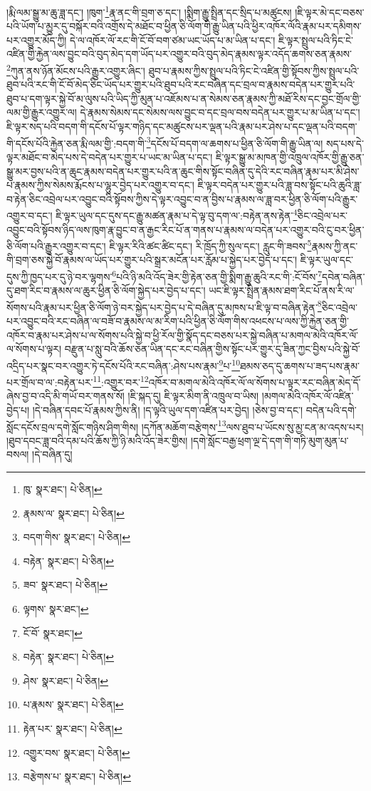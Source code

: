 །རྨི་ལམ་སྒྱུ་མ་ཆུ་ཟླ་དང་། །ཁུག་\footnote{ཁུ་  སྣར་ཐང་།  པེ་ཅིན། }རྣ་ནང་གི་བྲག་ཅ་དང་། །སྨིག་རྒྱུ་སྤྲིན་དང་སྲིད་པ་མཚུངས། །ཇི་ལྟར་མེ་དང་བཅས་པའི་ཡོག་པ་མྱུར་དུ་བསྐོར་བའི་འགྲོས་དེ་མཐོང་བ་ཕྱིན་ཅི་ལོག་གི་རྒྱུ་ཡིན་པའི་ཕྱིར་འཁོར་ལོའི་རྣམ་པར་དམིགས་པར་འགྱུར་མོད་ཀྱི། དེ་ལ་འཁོར་ལོ་རང་གི་ངོ་བོ་བག་ཙམ་ཡང་ཡོད་པ་མ་ཡིན་པ་དང་། ཇི་ལྟར་སྤྲུལ་པའི་ཏིང་ངེ་འཛིན་གྱི་རྐྱེན་ལས་བྱུང་བའི་བུད་མེད་དག་ཡོད་པར་འགྱུར་བའི་བུད་མེད་རྣམས་ལྟར་འདོད་ཆགས་ཅན་རྣམས་\footnote{རྣམས་ལ་  སྣར་ཐང་།  པེ་ཅིན། }ཀུན་ནས་ཉོན་མོངས་པའི་རྒྱུར་འགྱུར་ཞིང་། ཐུབ་པ་རྣམས་ཀྱིས་སྤྲུལ་པའི་ཏིང་ངེ་འཛིན་གྱི་སྟོབས་ཀྱིས་སྤྲུལ་པའི་ཐུབ་པའི་རང་གི་ངོ་བོ་མེད་ཅིང་ཡོད་པར་གྱུར་པའི་ཐུབ་པའི་རང་བཞིན་དང་བྲལ་བ་རྣམས་བདེན་པར་གྱུར་པའི་ཐུབ་པ་དག་ལྟར་སྐྱེ་བོ་མ་ལུས་པའི་ཡིད་ཀྱི་མུན་པ་འཇོམས་པ་ན་སེམས་ཅན་རྣམས་ཀྱི་མཐོ་རིས་དང་བྱང་གྲོལ་གྱི་ལམ་གྱི་རྒྱུར་འགྱུར་ལ། དེ་རྣམས་སེམས་དང་སེམས་ལས་བྱུང་བ་དང་བྲལ་བས་བདེན་པར་གྱུར་པ་མ་ཡིན་པ་དང་། ཇི་ལྟར་སད་པའི་བདག་གི་དངོས་པོ་ལྟར་གཉིད་དང་མཚུངས་པར་ལྡན་པའི་རྣམ་པར་ཤེས་པ་དང་ལྡན་པའི་བདག་གི་དངོས་པོའི་རྐྱེན་ཅན་རྨི་ལམ་གྱི་:བདག་གི་\footnote{བདག་གིས་  སྣར་ཐང་།  པེ་ཅིན། }དངོས་པོ་བདག་ལ་ཆགས་པ་ཕྱིན་ཅི་ལོག་གི་རྒྱུ་ཡིན་ལ། སད་པས་དེ་ལྟར་མཐོང་བ་མེད་པས་དེ་བདེན་པར་གྱུར་པ་ཡང་མ་ཡིན་པ་དང་། ཇི་ལྟར་སྒྱུ་མ་མཁན་གྱི་འཁྲུལ་འཁོར་གྱི་རྒྱུ་ཅན་སྒྱུ་མར་བྱས་པའི་ན་ཆུང་རྣམས་བདེན་པར་གྱུར་པའི་ན་ཆུང་གིས་སྟོང་བཞིན་དུ་དེའི་རང་བཞིན་རྣམ་པར་མི་ཤེས་པ་རྣམས་ཀྱིས་སེམས་རྨོངས་པ་ལྷུར་བྱེད་པར་འགྱུར་བ་དང་། ཇི་ལྟར་བདེན་པར་གྱུར་པའི་ཟླ་བས་སྟོང་པའི་ཆུའི་ཟླ་བ་རྟེན་ཅིང་འབྲེལ་པར་འབྱུང་བའི་སྟོབས་ཀྱིས་དེ་ལྟར་འབྱུང་བ་ན་བྱིས་པ་རྣམས་ལ་ཟླ་བར་ཕྱིན་ཅི་ལོག་པའི་རྒྱུར་འགྱུར་བ་དང་། ཇི་ལྟར་ཡུལ་དང་དུས་དང་རྒྱུ་མཚན་རྣམ་པ་དེ་ལྟ་བུ་དག་ལ་:བརྟེན་ནས་རྟེན་\footnote{བརྟེན་  སྣར་ཐང་།  པེ་ཅིན། }ཅིང་འབྲེལ་པར་འབྱུང་བའི་སྟོབས་ཉིད་ལས་ཁུག་རྣ་བྱུང་བ་ན་རྒྱང་རིང་པོ་ན་གནས་པ་རྣམས་ལ་བདེན་པར་འགྱུར་བའི་ངུ་བར་ཕྱིན་ཅི་ལོག་པའི་རྒྱུར་འགྱུར་བ་དང་། ཇི་ལྟར་རིའི་ཚང་ཚིང་དང་། རི་ཁྲོད་ཀྱི་སུལ་དང་། རླུང་གི་ཟབས་\footnote{ཟབ་  སྣར་ཐང་།  པེ་ཅིན། }རྣམས་ཀྱི་ནང་གི་བྲག་ཅས་སྐྱེ་བོ་རྣམས་ལ་ཡོད་པར་གྱུར་པའི་སྒྲར་མངོན་པར་རློམ་པ་སྐྱེད་པར་བྱེད་པ་དང་། ཇི་ལྟར་ཡུལ་དང་དུས་ཀྱི་ཁྱད་པར་དུ་ཉེ་བར་ལྷགས་\footnote{ལྟགས་  སྣར་ཐང་། }པའི་ཉི་མའི་འོད་ཟེར་གྱི་རྟེན་ཅན་གྱི་སྨིག་རྒྱུ་ཆུའི་རང་གི་:ངོ་བོས་\footnote{ངོ་བོ་  སྣར་ཐང་། }དབེན་བཞིན་དུ་ཐག་རིང་བ་རྣམས་ལ་ཆུར་ཕྱིན་ཅི་ལོག་སྐྱེད་པར་བྱེད་པ་དང་། ཡང་ཇི་ལྟར་སྤྲིན་རྣམས་ཐག་རིང་པོ་ནས་རི་ལ་སོགས་པའི་རྣམ་པར་ཕྱིན་ཅི་ལོག་ཉེ་བར་སྐྱེད་པར་བྱེད་པ་དེ་བཞིན་དུ་མཁས་པ་ཇི་ལྟ་བ་བཞིན་རྟེན་\footnote{བརྟེན་  སྣར་ཐང་།  པེ་ཅིན། }ཅིང་འབྲེལ་པར་འབྱུང་བའི་རང་བཞིན་ལ་བཟོ་བ་རྣམས་ལ་མ་རིག་པའི་ཕྱིན་ཅི་ལོག་གིས་འཕངས་པ་ལས་ཀྱི་རྐྱེན་ཅན་གྱི་འཁོར་བ་རྣམ་པར་ཤེས་པ་ལ་སོགས་པའི་སྐྱེ་བ་ཕྱི་རོལ་གྱི་སྣོད་དང་བཅས་པར་སྐྱེ་བཞིན་པ་མགལ་མེའི་འཁོར་ལོ་ལ་སོགས་པ་ལྟར། བརྫུན་པ་སླུ་བའི་ཆོས་ཅན་ཡིན་དང་རང་བཞིན་གྱིས་སྟོང་པར་གྱུར་དུ་ཟིན་ཀྱང་བྱིས་པའི་སྐྱེ་བོ་འདྲིད་པར་སྣང་བར་འགྱུར་ཏེ་དངོས་པོའི་རང་བཞིན་:ཤེས་པས་རྣམ་\footnote{ཤེས་  སྣར་ཐང་།  པེ་ཅིན། }པ་\footnote{པ་རྣམས་  སྣར་ཐང་།  པེ་ཅིན། }ཐམས་ཅད་དུ་ཆགས་པ་ཟད་པས་རྣམ་པར་གྲོལ་བ་ལ་:བརྟེན་པར་\footnote{རྟེན་པར་  སྣར་ཐང་།  པེ་ཅིན། }:འགྱུར་བར་\footnote{འགྱུར་བས་  སྣར་ཐང་།  པེ་ཅིན། }འཁོར་བ་མགལ་མེའི་འཁོར་ལོ་ལ་སོགས་པ་ལྟར་རང་བཞིན་མེད་དོ་ཞེས་བྱ་བ་འདི་མི་གཡོ་བར་གནས་སོ། །ཇི་སྐད་དུ། ཇི་ལྟར་མིག་ནི་འཁྲུལ་བ་ཡིས། །མགལ་མེའི་འཁོར་ལོ་འཛིན་བྱེད་པ། །དེ་བཞིན་དབང་པོ་རྣམས་ཀྱིས་ནི། །ད་ལྟའི་ཡུལ་དག་འཛིན་པར་བྱེད། །ཅེས་བྱ་བ་དང་། བདེན་པའི་དགེ་སློང་དངོས་བྲལ་དགེ་སློང་གཉིས་ཤིག་གིས། །དཀོན་མཆོག་བརྩེགས་\footnote{བརྩེགས་པ་  སྣར་ཐང་།  པེ་ཅིན། }ལས་ཐུབ་པ་ཡོངས་སུ་མྱ་ངན་མ་འདས་པར། །ཐུབ་དབང་ཟླ་བའི་དམ་པའི་ཆོས་ཀྱི་ཉི་མའི་འོད་ཟེར་གྱིས། །དགེ་སློང་བརྒྱ་ཕྲག་ལྔ་དེ་དག་གི་གཏི་མུག་མུན་པ་བསལ། །དེ་བཞིན་དུ། 